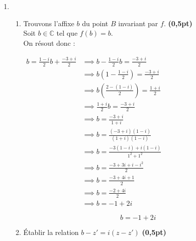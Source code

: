 \documentclass[12pt,a4paper]{article}
\begin{document}
\begin{enumerate}
    \item 
    \begin{enumerate}
        \item Trouvons l’affixe \( b \) du point \( B \) invariant par \( f \). \hfill \textbf{(0,5pt)}\\

        Soit \( b \in \mathbb{C} \) tel que \( f(b) = b \).\\
        On résout donc :

        \(
        \begin{aligned}
            b = \frac{1 - i}{2} b + \frac{-3 + i}{2} &\implies b - \frac{1 - i}{2} b = \frac{-3 + i}{2}\\
                                                     &\implies b \left(1 - \frac{1 - i}{2} \right) = \frac{-3 + i}{2}\\
                                                     &\implies b\left(\frac{2 - (1 - i)}{2}\right) = \frac{1 + i}{2}\\
                                                     &\implies \frac{1 + i}{2}b = \frac{-3 + i}{2}\\
                                                     &\implies b= \frac{-3 + i}{1 + i}\\
                                                     &\implies b = \frac{(-3 + i)(1 - i)}{(1 + i)(1 - i)}\\
                                                     &\implies b=\frac{-3(1 - i) + i(1 - i)}{1^2 + 1^2}\\
                                                     &\implies b = \frac{-3 + 3i + i - i^2}{2}\\
                                                     &\implies b = \frac{-3 + 4i + 1}{2}\\
                                                     &\implies b = \frac{-2 + 4i}{2}\\
                                                     &\implies b=-1 + 2i
        \end{aligned}
        \)

        \begin{resultbox}
        \[
        \boxed{b = -1 + 2i}
        \]
        \end{resultbox}
                \item Établir la relation \( b - z' = i(z - z') \)  \hfill \textbf{(0,5pt)}
                

\end{enumerate}
\end{enumerate}
\end{document}

